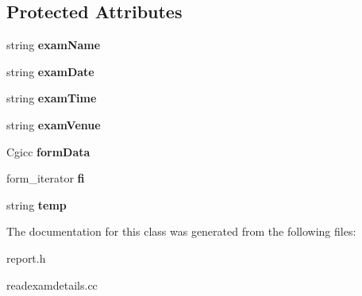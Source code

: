 \subsection*{Protected Attributes}
\begin{DoxyCompactItemize}
\item 
\hypertarget{classReadExamDetails_a815896608a58b449b451305306dd8d38}{string {\bfseries exam\-Name}}\label{classReadExamDetails_a815896608a58b449b451305306dd8d38}

\item 
\hypertarget{classReadExamDetails_a66cd09674039e76f3137d08fea2d9ef2}{string {\bfseries exam\-Date}}\label{classReadExamDetails_a66cd09674039e76f3137d08fea2d9ef2}

\item 
\hypertarget{classReadExamDetails_a86b8b41b014ce26c12113b49137520ef}{string {\bfseries exam\-Time}}\label{classReadExamDetails_a86b8b41b014ce26c12113b49137520ef}

\item 
\hypertarget{classReadExamDetails_a0ef2238b4dd4e930b278658fcf184b73}{string {\bfseries exam\-Venue}}\label{classReadExamDetails_a0ef2238b4dd4e930b278658fcf184b73}

\item 
\hypertarget{classReadExamDetails_a7dff5b6a855ccacaf477b3dd79850c91}{Cgicc {\bfseries form\-Data}}\label{classReadExamDetails_a7dff5b6a855ccacaf477b3dd79850c91}

\item 
\hypertarget{classReadExamDetails_a2d108fa7b89860260891d1fc13329153}{form\-\_\-iterator {\bfseries fi}}\label{classReadExamDetails_a2d108fa7b89860260891d1fc13329153}

\item 
\hypertarget{classReadExamDetails_a77167675e8c30ba10941b7e36866e08e}{string {\bfseries temp}}\label{classReadExamDetails_a77167675e8c30ba10941b7e36866e08e}

\end{DoxyCompactItemize}


The documentation for this class was generated from the following files\-:\begin{DoxyCompactItemize}
\item 
report.\-h\item 
readexamdetails.\-cc\end{DoxyCompactItemize}
